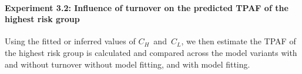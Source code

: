 \paragraph{Experiment 3.2: Influence of turnover on the predicted TPAF of the highest risk group}
Using the fitted or inferred values of $C_H$~and~$C_L$, we then estimate the 
TPAF of the highest risk group is calculated and compared across the model variants with and without turnover without model fitting, and with model fitting. 

